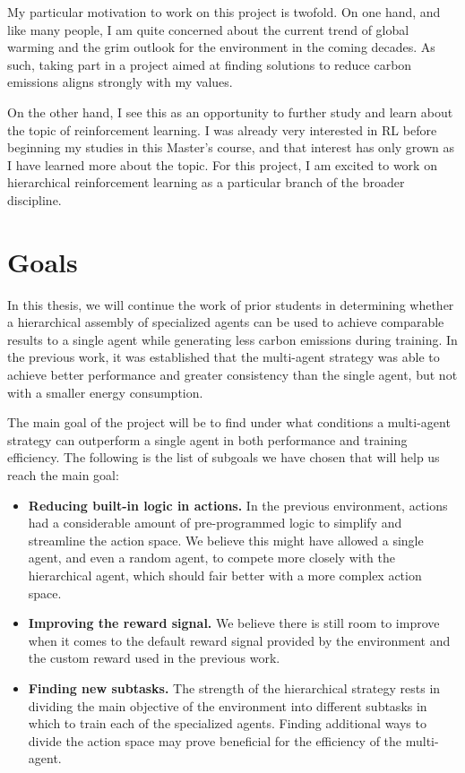 My particular motivation to work on this project is twofold. On one hand, and like many people, I am quite concerned about the current trend of global warming and the grim outlook for the environment in the coming decades. As such, taking part in a project aimed at finding solutions to reduce carbon emissions aligns strongly with my values.

On the other hand, I see this as an opportunity to further study and learn about the topic of reinforcement learning. I was already very interested in RL before beginning my studies in this Master's course, and that interest has only grown as I have learned more about the topic. For this project, I am excited to work on hierarchical reinforcement learning as a particular branch of the broader discipline.

\section{Goals}
\label{section:goals}

In this thesis, we will continue the work of prior students \cite{Caceres:2024, Gimenez:2024} in determining whether a hierarchical assembly of specialized agents can be used to achieve comparable results to a single agent while generating less carbon emissions during training. In the previous work, it was established that the multi-agent strategy was able to achieve better performance and greater consistency than the single agent, but not with a smaller energy consumption.

The main goal of the project will be to find under what conditions a multi-agent strategy can outperform a single agent in both performance and training efficiency. The following is the list of subgoals we have chosen that will help us reach the main goal:

\begin{itemize}
    \item \textbf{Reducing built-in logic in actions.} In the previous environment, actions had a considerable amount of pre-programmed logic to simplify and streamline the action space. We believe this might have allowed a single agent, and even a random agent, to compete more closely with the hierarchical agent, which should fair better with a more complex action space.
    \item \textbf{Improving the reward signal.} We believe there is still room to improve when it comes to the default reward signal provided by the environment and the custom reward used in the previous work.
    \item \textbf{Finding new subtasks.} The strength of the hierarchical strategy rests in dividing the main objective of the environment into different subtasks in which to train each of the specialized agents. Finding additional ways to divide the action space may prove beneficial for the efficiency of the multi-agent.
\end{itemize}


